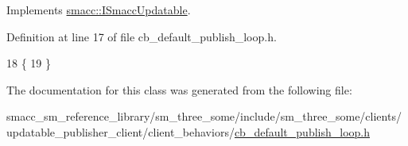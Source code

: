 Implements \hyperlink{classsmacc_1_1ISmaccUpdatable_a84ee0520cbefdb1d412bed54650b028e}{smacc\+::\+I\+Smacc\+Updatable}.



Definition at line 17 of file cb\+\_\+default\+\_\+publish\+\_\+loop.\+h.


\begin{DoxyCode}
18     \{
19     \}
\end{DoxyCode}


The documentation for this class was generated from the following file\+:\begin{DoxyCompactItemize}
\item 
smacc\+\_\+sm\+\_\+reference\+\_\+library/sm\+\_\+three\+\_\+some/include/sm\+\_\+three\+\_\+some/clients/updatable\+\_\+publisher\+\_\+client/client\+\_\+behaviors/\hyperlink{cb__default__publish__loop_8h}{cb\+\_\+default\+\_\+publish\+\_\+loop.\+h}\end{DoxyCompactItemize}
